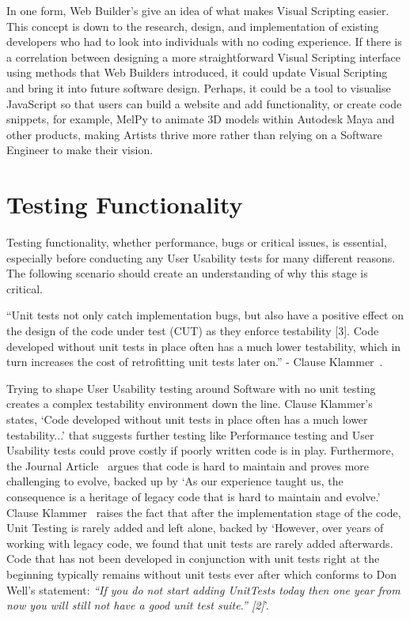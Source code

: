 \documentclass[12pt]{report} %
\begin{document}
			In one form, Web Builder's give an idea of what makes Visual Scripting easier. This concept is down to the research, design, and implementation of existing developers who had to look into individuals with no coding experience. If there is a correlation between designing a more straightforward Visual Scripting interface using methods that Web Builders introduced, it could update Visual Scripting and bring it into future software design. Perhaps, it could be a tool to visualise JavaScript so that users can build a website and add functionality, or create code snippets, for example, MelPy to animate 3D models within Autodesk Maya and other products, making Artists thrive more rather than relying on a Software Engineer to make their vision.

	\section{Testing Functionality}
		Testing functionality, whether performance, bugs or critical issues, is essential, especially before conducting any User Usability tests for many different reasons. The following scenario should create an understanding of why this stage is critical. 

		\begin{center}
			``Unit tests not only catch implementation bugs, but also have a positive effect on the design of the code under test (CUT) as they enforce testability [3]. Code developed without unit tests in place often has a much lower testability, which in turn increases the cost of retrofitting unit tests later on.'' - Clause Klammer~\cite{klammer_writing_2015}.
		\end{center}
		
		Trying to shape User Usability testing around Software with no unit testing creates a complex testability environment down the line. Clause Klammer's~\cite{klammer_writing_2015} states, `Code developed without unit tests in place often has a much lower testability...' that suggests further testing like Performance testing and User Usability tests could prove costly if poorly written code is in play. Furthermore, the Journal Article~\cite{klammer_writing_2015} argues that code is hard to maintain and proves more challenging to evolve, backed up by `As our experience taught us, the consequence is a heritage of legacy code that is hard to maintain and evolve.' Clause Klammer~\cite{klammer_writing_2015} raises the fact that after the implementation stage of the code, Unit Testing is rarely added and left alone, backed by `However, over years of working with legacy code, we found that unit tests are rarely added afterwards. Code that has not been developed in conjunction with unit tests right at the beginning typically remains without unit tests ever after which conforms to Don Well's statement: \textit{“If you do not start adding UnitTests today then one year from now you will still not have a good unit test suite.” [2]}'.
		
\end{document}
